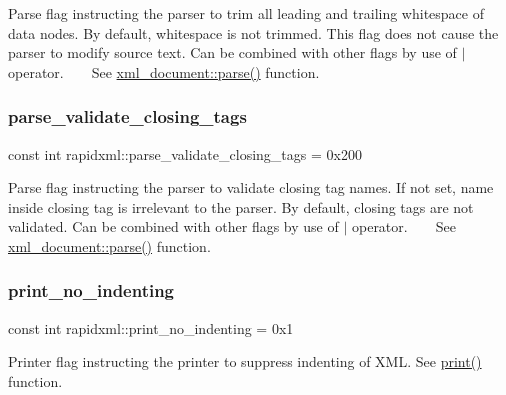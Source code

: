 Parse flag instructing the parser to trim all leading and trailing whitespace of data nodes. By default, whitespace is not trimmed. This flag does not cause the parser to modify source text. Can be combined with other flags by use of $\vert$ operator. ~\newline
~\newline
 See \mbox{\hyperlink{classrapidxml_1_1xml__document_ac6e73ff9ac323bf5a370c38feb03a6b1}{xml\+\_\+document\+::parse()}} function. \mbox{\label{namespacerapidxml_a7ce8f40fda68338e20b56f41e48e49f3}} 
\subsubsection{\texorpdfstring{parse\+\_\+validate\+\_\+closing\+\_\+tags}{parse\_validate\_closing\_tags}}
{\footnotesize\ttfamily const int rapidxml\+::parse\+\_\+validate\+\_\+closing\+\_\+tags = 0x200}

Parse flag instructing the parser to validate closing tag names. If not set, name inside closing tag is irrelevant to the parser. By default, closing tags are not validated. Can be combined with other flags by use of $\vert$ operator. ~\newline
~\newline
 See \mbox{\hyperlink{classrapidxml_1_1xml__document_ac6e73ff9ac323bf5a370c38feb03a6b1}{xml\+\_\+document\+::parse()}} function. \mbox{\label{namespacerapidxml_a65477b812a80f5bda693ec57e57de064}} 
\subsubsection{\texorpdfstring{print\+\_\+no\+\_\+indenting}{print\_no\_indenting}}
{\footnotesize\ttfamily const int rapidxml\+::print\+\_\+no\+\_\+indenting = 0x1}



Printer flag instructing the printer to suppress indenting of X\+ML. See \mbox{\hyperlink{namespacerapidxml_a0fb0be6eba49fb2e2646d5a72a0dc355}{print()}} function. 

